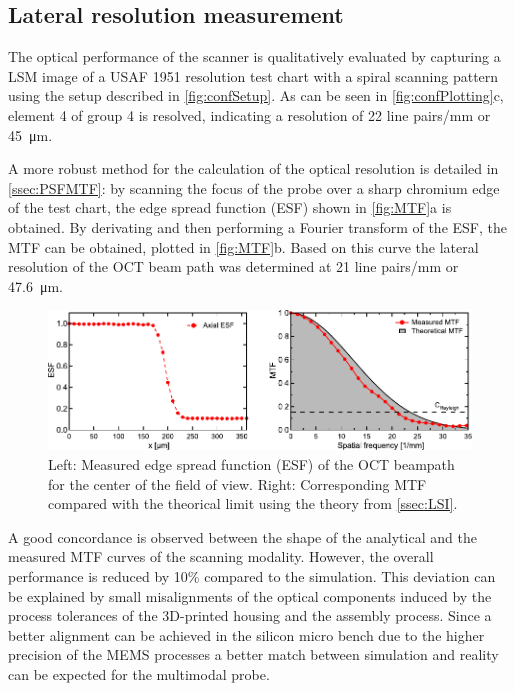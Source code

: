 \subsection{Lateral resolution measurement}
The optical performance of the scanner is qualitatively evaluated by capturing a LSM image of a USAF 1951 resolution test chart with a spiral scanning pattern using the setup described in \autoref{fig:confSetup}. As can be seen in \autoref{fig:confPlotting}c, element 4 of group 4 is resolved, indicating a resolution of 22 line pairs/mm or \SI{45}{\micro\meter}. 

A more robust method for the calculation of the optical resolution is detailed in \autoref{ssec:PSFMTF}: by scanning the focus of the probe over a sharp chromium edge of the test chart, the edge spread function (ESF) shown in \autoref{fig:MTF}a is obtained. By derivating and then performing a Fourier transform of the ESF, the MTF can be obtained, plotted in \autoref{fig:MTF}b. Based on this curve the lateral resolution of the OCT beam path was determined at 21 line pairs/mm or \SI{47.6}{\micro\meter}. 
\begin{figure}[h!]\centering \includegraphics{figures/50_Measurements/conf/res/confResMeas.pdf}
      \caption{Left: Measured edge spread function (ESF) of the OCT beampath for the center of the field of view. 
      Right: Corresponding MTF compared with the theorical limit using the theory from \autoref{ssec:LSI}.}
      \label{fig:MTF}
\end{figure}
A good concordance is observed between the shape of the analytical and the measured MTF curves of the scanning modality. However, the overall performance is reduced by 10\% compared to the simulation. This deviation can be explained by small misalignments of the optical components induced by the process tolerances of the 3D-printed housing and the assembly process. Since a better alignment can be achieved in the silicon micro bench due to the higher precision of the MEMS processes a better match between simulation and reality can be expected for the multimodal probe.

